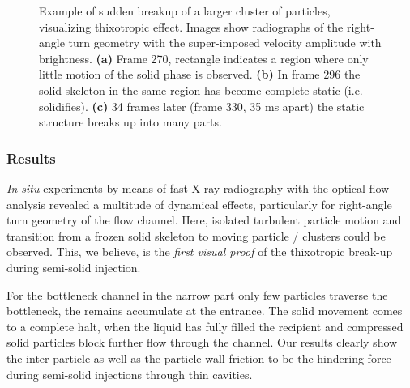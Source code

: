 \begin{figure}[ht]
  \centerline{
    \mbox{}
    \mbox{}
    \mbox{}
  }
  \caption{Example of sudden breakup of a larger cluster of particles, visualizing thixotropic effect. Images show radiographs of the right-angle turn geometry with the super-imposed velocity amplitude with brightness. \textbf{(a)} Frame 270, rectangle indicates a region where only little motion of the solid phase is observed. \textbf{(b)} In frame 296 the solid skeleton in the same region has become complete static (i.e. solidifies). \textbf{(c)} 34 frames later (frame 330, 35 ms apart) the static structure breaks up into many parts.}
  \label{fig:app_thixo_break}
\end{figure}


%
%
%


\subsubsection{Results}

\textit{In situ} experiments by means of fast X-ray radiography with the optical flow analysis revealed a multitude of dynamical effects, particularly for right-angle turn geometry of the flow channel. Here, isolated turbulent particle motion and transition from a frozen solid skeleton to moving particle / clusters could be observed. This, we believe, is the \textit{first visual proof} of the thixotropic break-up during semi-solid injection. 

For the bottleneck channel in the narrow part only few particles traverse the bottleneck, the remains accumulate at the entrance. The solid movement comes to a complete halt, when the liquid has fully filled the recipient and compressed solid particles block further flow through the channel. Our results clearly show the inter-particle as well as the particle-wall friction to be the hindering force during semi-solid injections through thin cavities.

